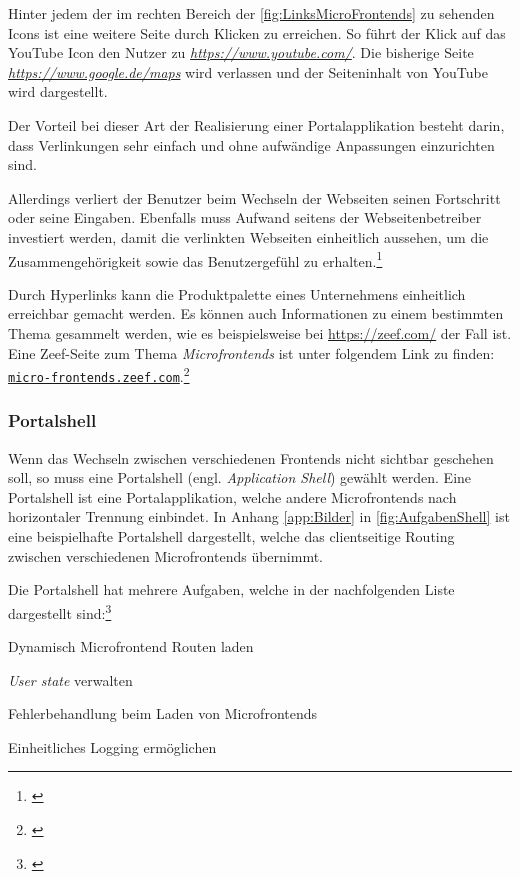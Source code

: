 Hinter jedem der im rechten Bereich der \cref{fig:LinksMicroFrontends} zu sehenden Icons ist eine weitere Seite durch Klicken zu erreichen. So führt der Klick auf das YouTube Icon den Nutzer zu \textit{\url{https://www.youtube.com/}}. Die bisherige Seite \textit{\url{https://www.google.de/maps}} wird verlassen und der Seiteninhalt von YouTube wird dargestellt.

Der Vorteil bei dieser Art der Realisierung einer Portalapplikation besteht darin, dass Verlinkungen sehr einfach und ohne aufwändige Anpassungen einzurichten sind.

Allerdings verliert der Benutzer beim Wechseln der Webseiten seinen Fortschritt oder seine Eingaben. Ebenfalls muss Aufwand seitens der Webseitenbetreiber investiert werden, damit die verlinkten Webseiten einheitlich aussehen, um die Zusammengehörigkeit sowie das Benutzergefühl zu erhalten.\footnote{\cite[vgl.][36]{Steyer2020}}

Durch Hyperlinks kann die Produktpalette eines Unternehmens einheitlich erreichbar gemacht werden. Es können auch Informationen zu einem bestimmten Thema gesammelt werden, wie es beispielsweise bei \url{https://zeef.com/} der Fall ist. Eine Zeef-Seite zum Thema \textit{Microfrontends} ist unter folgendem Link zu finden: \href{https://micro-frontends.zeef.com/elisabeth.engel?ref=elisabeth.engel&share=ee53d51a914b4951ae5c94ece97642fc}{\nolinkurl{micro-frontends.zeef.com}}.\footnote{\cite[vgl.][]{Engel2021}}

\subsubsection{Portalshell}\label{sec:PortalapplikationenPortalshell}

Wenn das Wechseln zwischen verschiedenen Frontends nicht sichtbar geschehen soll, so muss eine Portalshell (engl. \textit{Application Shell}) gewählt werden. Eine Portalshell ist eine Portalapplikation, welche andere Microfrontends nach horizontaler Trennung einbindet. In Anhang \ref{app:Bilder} in \cref{fig:AufgabenShell} ist eine beispielhafte Portalshell dargestellt, welche das clientseitige Routing zwischen verschiedenen Microfrontends übernimmt.

Die Portalshell hat mehrere Aufgaben, welche in der nachfolgenden Liste dargestellt sind:\footnote{\cite[vgl.][45\psq]{Mezzalira2021}}

\begin{compactitem}
	\item Dynamisch Microfrontend Routen laden
	\item \textit{User state} verwalten	
	\item Fehlerbehandlung beim Laden von Microfrontends
	\item Einheitliches Logging ermöglichen
\end{compactitem}

